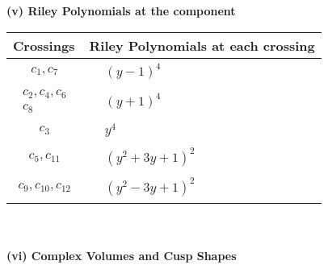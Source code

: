 \documentclass[1p]{elsarticle_modified}
\theoremstyle{definition}
\begin{document}
\newpage\renewcommand{\arraystretch}{1}
\flushleft \textbf{(v) Riley Polynomials at the component}\newline \\
\begin{tabular}{m{50pt}|m{274pt}}
Crossings & \hspace{64pt}Riley Polynomials at each crossing \\
\hline $$\begin{aligned}c_{1},c_{7}\end{aligned}$$&$\begin{aligned}
&(y-1)^4
\end{aligned}$\\
\hline $$\begin{aligned}c_{2},c_{4},c_{6}\\c_{8}\end{aligned}$$&$\begin{aligned}
&(y+1)^4
\end{aligned}$\\
\hline $$\begin{aligned}c_{3}\end{aligned}$$&$\begin{aligned}
&y^4
\end{aligned}$\\
\hline $$\begin{aligned}c_{5},c_{11}\end{aligned}$$&$\begin{aligned}
&(y^2+3 y+1)^2
\end{aligned}$\\
\hline $$\begin{aligned}c_{9},c_{10},c_{12}\end{aligned}$$&$\begin{aligned}
&(y^2-3 y+1)^2
\end{aligned}$\\
\hline
\end{tabular}\\~\\
\newpage\flushleft \textbf{(vi) Complex Volumes and Cusp Shapes}
\end{document}
